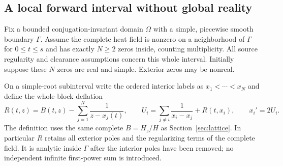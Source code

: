 \subsection{A local forward interval without global reality}

Fix a bounded conjugation-invariant domain $\Omega$ with a simple,
piecewise smooth boundary $\Gamma$. Assume the complete heat field is
nonzero on a neighborhood of $\Gamma$ for $0\le t\le s$ and has exactly
$N\ge2$ zeros inside, counting multiplicity. All source regularity and
clearance assumptions concern this whole interval. Initially suppose
these $N$ zeros are real and simple. Exterior zeros may be nonreal.

On a simple-root subinterval write the ordered interior labels as
$x_1<\cdots<x_N$ and define the whole-block deflation
\begin{equation}
 R(t,z)=B(t,z)-\sum_{j=1}^{N}\frac1{z-x_j(t)},\qquad
 U_i=\sum_{j\ne i}\frac1{x_i-x_j}+R(t,x_i),\qquad
 x_i'=2U_i.
 \label{fwd:deflation}
\end{equation}
The definition uses the same complete $B=H_z/H$ as
Section~\ref{sec:lattice}. In particular $R$ retains all exterior poles
and the regularizing terms of the complete field. It is analytic inside
$\Gamma$ after the interior poles have been removed; no independent
infinite first-power sum is introduced.

